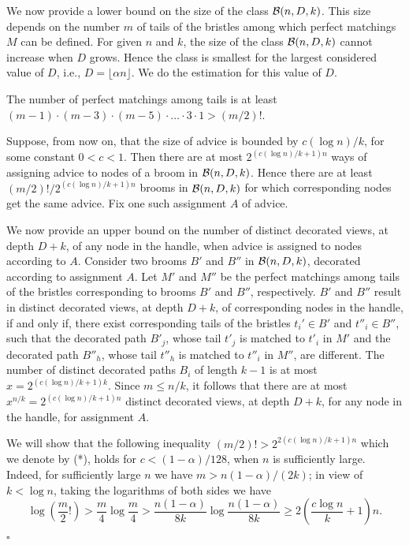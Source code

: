 \documentclass{article}
\newcommand{\cB}{{\cal B}}
\newcommand*{\qed}{\hfill\ensuremath{\square}}
\newenvironment{proof}{\noindent{\bf Proof:}}{\qed}
\begin{document}
\begin{proof}
We now provide a lower bound on the size of the class $\cB(n,D,k)$. 
This size depends on the number $m$ of tails of the bristles among which perfect matchings $M$ can be defined.
For given $n$ and $k$, the size of the class $\cB(n,D,k)$ cannot increase when $D$ grows. 
Hence the class is smallest for the largest considered value of $D$, i.e., $D=\lfloor \alpha n\rfloor$.
We do the estimation for this value of $D$.

The number of perfect matchings among tails is at least $(m-1)\cdot (m-3)\cdot (m-5)\cdot  \ldots \cdot 3\cdot 1> (m/2)! $.




Suppose, from now on, that the size of advice is bounded by $c (\log n)/k$, for some constant $0<c<1$.
Then there are at most $2^{(c(\log n)/k +1) n}$ ways of assigning advice to nodes of a broom in $\cB(n,D,k)$. 
Hence there are at least $(m/2)!/2^{(c(\log n)/k +1) n}$ brooms in $\cB(n,D,k)$ for which corresponding nodes get the same advice. Fix one such assignment $A$ of advice.


We now provide an upper bound on the number of distinct decorated views, at depth $D+k$, of any node in the handle, when advice is assigned to nodes according to $A$.
Consider two brooms $B'$ and $B''$ in $\cB(n,D,k)$, decorated according to assignment $A$.
Let $M'$ and $M''$ be the perfect matchings among tails of the bristles corresponding to brooms $B'$ and $B''$, respectively.
$B'$ and $B''$ result in distinct decorated views, at depth $D+k$, of corresponding nodes in the handle, if and only if, there exist corresponding tails of the bristles $t_i'\in B'$ and $t''_i\in B''$, such that the decorated path $B'_j$, whose tail  $t'_j$ is matched to $t'_i$ in $M'$ and the decorated path $B''_h$, whose tail  $t''_h$ is  matched to $t''_i$ in $M''$, are different.
The number of distinct decorated paths $B_i$ of length $k-1$ is at most $x=2^{(c(\log n)/k +1 )k}$.
Since $m\le n/k$, it follows that there are at most $x^{n/k}= 2^{(c(\log n)/k +1 )n}$ distinct decorated views, at depth $D+k$, for any node in the handle, for assignment $A$.

We will show that the following inequality
$(m/2)! > 2^{2(c(\log n)/k +1 )n }$
which we denote by (*),
holds for $c<(1-\alpha)/128$, when $n$ is sufficiently large. 
 Indeed, for sufficiently large $n$ we have $m > n(1-\alpha)/(2k)$; in view of $k<\log n$, taking the logarithms of both sides we have 
 $$\log \left(\frac{m}{2}!\right)>\frac{m}{4} \log \frac{m}{4}>\frac{n(1-\alpha)}{8k} \log \frac{n(1-\alpha)}{8k} \ge  2\left(\frac{c\log n}{k} +1 \right)n.$$


\end{proof}
\end{document}
